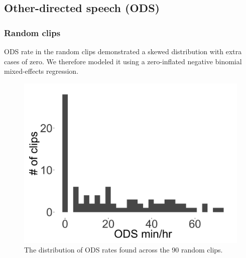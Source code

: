 \documentclass[floatsintext,man]{apa6}
\theoremstyle{definition}
\theoremstyle{definition}
\theoremstyle{definition}
\theoremstyle{remark}
\begin{document}
\FloatBarrier

\subsection{Other-directed speech (ODS)}\label{models-ods}

\subsubsection{Random clips}\label{models-ods-random}

ODS rate in the random clips demonstrated a skewed distribution with
extra cases of zero. We therefore modeled it using a zero-inflated
negative binomial mixed-effects regression.

\FloatBarrier

\begin{figure}[H]

{\centering \includegraphics[width=0.4\linewidth]{www/ODS_random_distribution} 

}

\caption{The distribution of ODS rates found across the 90 random clips.}\label{fig:fig7}
\end{figure}

\FloatBarrier
\end{document}
